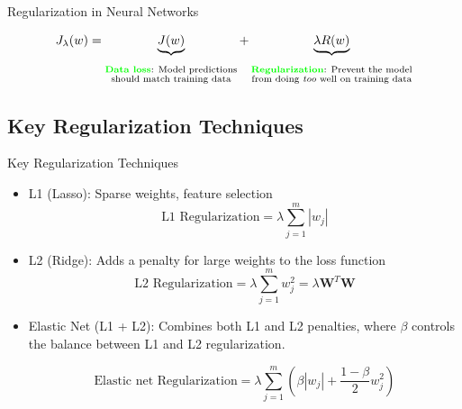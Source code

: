 \documentclass[serif, aspectratio=169]{beamer}
\begin{document}
\begin{frame}{Regularization in Neural Networks}
    
\begin{equation}
J_\lambda(w) = \underbrace{J(w)}_{{\substack{\vphantom{\text{Prevent the model}} \\ \text{\textcolor{green} {\textbf{Data loss}}: Model predictions} \\ \text{should match training data}}}} + \underbrace{\lambda R(w)}_{{\substack{\vphantom{\text{Prevent the model}} \\ \text{\textcolor{green} {\textbf{Regularization}}: Prevent the model} \\ \text{from doing \textit{too} well on training data}}}}
\end{equation}


\end{frame}

\subsection{Key Regularization Techniques}
\begin{frame}{Key Regularization Techniques}
    \begin{itemize}[<+-| alert@+>] %

            \item L1 (Lasso): Sparse weights, feature selection
                \begin{equation}
                    \text{L1 Regularization} = \lambda \sum_{j=1}^{m} |w_j|
                \end{equation}

            \item L2 (Ridge): Adds a penalty for large weights to the loss function
                \begin{equation}
                    \text{L2 Regularization} = \lambda \sum_{j=1}^{m} w_j^2 =
                    \lambda \textbf{W}^T\textbf{W}
                \end{equation}

            \item Elastic Net (L1 + L2): Combines both L1 and L2 penalties, where $\beta$ controls the balance between L1 and L2 regularization.

                \begin{equation}
                    \text{Elastic net Regularization} =\lambda \sum_{j=1}^{m} (\beta|w_j| + \frac{1-\beta}{2} w_j^2)
                \end{equation}
            
    \end{itemize}
\end{frame}
\end{document}
